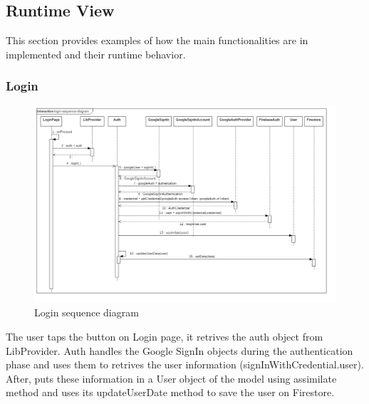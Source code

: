 \subsection{Runtime View}
This section provides examples of how the main functionalities are in implemented and their runtime behavior.
\subsubsection{Login}
\begin{figure}[!h]
    \centering
    \includegraphics[scale=0.4]{images/login-sequence-diagram.png}
    \caption{Login sequence diagram}
    \label{ref:loginsequencediagram}
\end{figure}
The user taps the button on Login page, it retrives the auth object from LibProvider. 
Auth handles the Google SignIn objects during the authentication phase and 
uses them to retrives the user information (signInWithCredential.user).\\
After, puts these information in a User object of the model using assimilate method and 
uses its updateUserDate method to save the user on Firestore.
\clearpage
